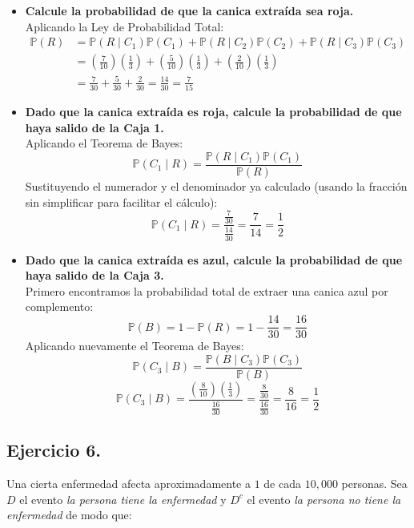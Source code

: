 \documentclass[10pt,a4paper]{book}
\begin{document}
\begin{itemize}
    \item[\textbf{a)}] \textbf{Calcule la probabilidad de que la canica extraída sea roja.} \\
    Aplicando la Ley de Probabilidad Total:
    \begin{align*}
        \mathbb{P}(R) &= \mathbb{P}(R \mid C_1)\mathbb{P}(C_1) + \mathbb{P}(R \mid C_2)\mathbb{P}(C_2) + \mathbb{P}(R \mid C_3)\mathbb{P}(C_3) \\
        &= \left(\frac{7}{10}\right)\left(\frac{1}{3}\right) + \left(\frac{5}{10}\right)\left(\frac{1}{3}\right) + \left(\frac{2}{10}\right)\left(\frac{1}{3}\right) \\
        &= \frac{7}{30} + \frac{5}{30} + \frac{2}{30} = \frac{14}{30} = \frac{7}{15}
    \end{align*}

    \item[\textbf{b)}] \textbf{Dado que la canica extraída es roja, calcule la probabilidad de que haya salido de la Caja 1.} \\
    Aplicando el Teorema de Bayes:
    \[ \mathbb{P}(C_1 \mid R) = \frac{\mathbb{P}(R \mid C_1)\mathbb{P}(C_1)}{\mathbb{P}(R)} \]
    Sustituyendo el numerador y el denominador ya calculado (usando la fracción sin simplificar para facilitar el cálculo):
    \[ \mathbb{P}(C_1 \mid R) = \frac{\frac{7}{30}}{\frac{14}{30}} = \frac{7}{14} = \frac{1}{2} \]

    \item[\textbf{c)}] \textbf{Dado que la canica extraída es azul, calcule la probabilidad de que haya salido de la Caja 3.} \\
    Primero encontramos la probabilidad total de extraer una canica azul por complemento:
    \[ \mathbb{P}(B) = 1 - \mathbb{P}(R) = 1 - \frac{14}{30} = \frac{16}{30} \]
    Aplicando nuevamente el Teorema de Bayes:
    \[ \mathbb{P}(C_3 \mid B) = \frac{\mathbb{P}(B \mid C_3)\mathbb{P}(C_3)}{\mathbb{P}(B)} \]
    \[ \mathbb{P}(C_3 \mid B) = \frac{\left(\frac{8}{10}\right)\left(\frac{1}{3}\right)}{\frac{16}{30}} = \frac{\frac{8}{30}}{\frac{16}{30}} = \frac{8}{16} = \frac{1}{2} \]
\end{itemize}

\newpage

\subsection{Ejercicio 6.} Una cierta enfermedad afecta aproximadamente a  
\(1\) de cada \(10,000\) personas. Sea
$D$ el evento \textit{la persona tiene la enfermedad} y \(D^{c}\) el evento \textit{la persona no tiene la enfermedad}
de modo que:
\end{document}
